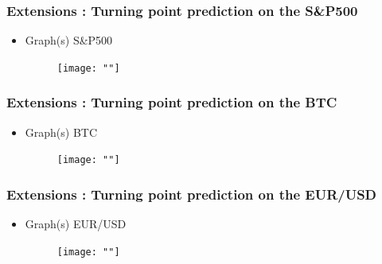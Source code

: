 \documentclass{beamer}
\begin{document}
\begin{frame}
    \frametitle{Extensions : Turning point prediction on the S&P500}
    \begin{itemize}
        \item Graph(s) S&P500
        \begin{figure}[h]
        \texttt{[image: ""]}
        \end{figure}
    \end{itemize}
\end{frame}

\begin{frame}
    \frametitle{Extensions : Turning point prediction on the BTC}
    \begin{itemize}
        \item Graph(s) BTC
        \begin{figure}[h]
        \texttt{[image: ""]}
        \end{figure}
    \end{itemize}
\end{frame}

\begin{frame}
    \frametitle{Extensions : Turning point prediction on the EUR/USD}
    \begin{itemize}
        \item Graph(s) EUR/USD
        \begin{figure}[h]
        \texttt{[image: ""]}
        \end{figure}
    \end{itemize}
\end{frame}
\end{document}
